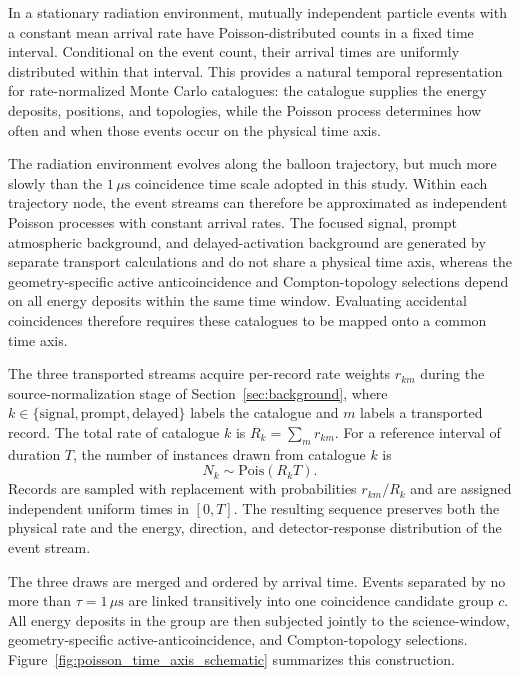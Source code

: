 \documentclass[11pt]{article}
\begin{document}
In a stationary radiation environment, mutually independent particle events
with a constant mean arrival rate have Poisson-distributed counts in a fixed
time interval. Conditional on the event count, their arrival times are
uniformly distributed within that interval. This provides a natural temporal
representation for rate-normalized Monte Carlo catalogues: the catalogue
supplies the energy deposits, positions, and topologies, while the Poisson
process determines how often and when those events occur on the physical time
axis.

The radiation environment evolves along the balloon trajectory, but much more
slowly than the $1\,\mu\mathrm{s}$ coincidence time scale adopted in this study.
Within each trajectory node, the event streams can therefore be approximated as
independent Poisson processes with constant arrival rates. The focused signal,
prompt atmospheric background, and delayed-activation background are generated
by separate transport calculations and do not share a physical time axis,
whereas the geometry-specific active anticoincidence and Compton-topology selections depend on all
energy deposits within the same time window. Evaluating accidental coincidences
therefore requires these catalogues to be mapped onto a common time axis.

The three transported streams acquire per-record rate weights $r_{km}$ during
the source-normalization stage of Section~\ref{sec:background}, where
$k\in\{\mathrm{signal},\mathrm{prompt},\mathrm{delayed}\}$ labels the catalogue
and $m$ labels a transported record. The total rate of catalogue $k$ is
$R_k=\sum_m r_{km}$. For a reference interval of duration $T$, the number of
instances drawn from catalogue $k$ is
\begin{equation}
 N_k\sim\mathrm{Pois}(R_kT).
 \label{eq:poisson_superposition}
\end{equation}
Records are sampled with replacement with probabilities $r_{km}/R_k$ and are
assigned independent uniform times in $[0,T]$. The resulting sequence preserves
both the physical rate and the energy, direction, and detector-response
distribution of the event stream.

The three draws are merged and ordered by arrival time. Events separated by no
more than $\tau=1\,\mu\mathrm{s}$ are linked transitively into one coincidence
candidate group $c$. All energy deposits in the group are then subjected jointly
to the science-window, geometry-specific active-anticoincidence, and Compton-topology selections.
Figure~\ref{fig:poisson_time_axis_schematic} summarizes this construction.
\end{document}
